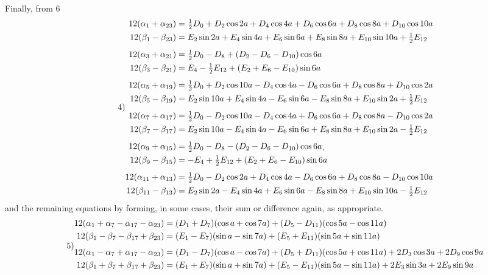 \begin{landscape}
\[\begin{aligned}
\end{aligned}
\]
\clearpage{}
\par\noindent\hspace*{\parindent}Finally, from 6
\[
\tag*{4)}
\begin{aligned}
12(\alpha_1+\alpha_{23})&=\tfrac12 D_0+D_2\cos2a+D_4\cos4a+D_6\cos6a+D_8\cos8a+D_{10}\cos10a\\
12(\beta_1-\beta_{23})&=E_2\sin2a+E_4\sin4a+E_6\sin6a+E_8\sin8a+E_{10}\sin10a+\tfrac12 E_{12}\\[4pt]
12(\alpha_3+\alpha_{21})&=\tfrac12 D_0-D_8+(D_2-D_6-D_{10})\cos6a\\
12(\beta_3-\beta_{21})&=E_4-\tfrac12 E_{12}+(E_2+E_6-E_{10})\sin6a\\[4pt]
12(\alpha_5+\alpha_{19})&=\tfrac12 D_0+D_2\cos10a-D_4\cos4a-D_6\cos6a+D_8\cos8a+D_{10}\cos2a\\
12(\beta_5-\beta_{19})&=E_2\sin10a+E_4\sin4a-E_6\sin6a-E_8\sin8a+E_{10}\sin2a+\tfrac12 E_{12}\\[4pt]
12(\alpha_7+\alpha_{17})&=\tfrac12 D_0-D_2\cos10a-D_4\cos4a+D_6\cos6a+D_8\cos8a-D_{10}\cos2a\\
12(\beta_7-\beta_{17})&=E_2\sin10a-E_4\sin4a-E_6\sin6a+E_8\sin8a+E_{10}\sin2a-\tfrac12 E_{12}\\[4pt]
12(\alpha_9+\alpha_{15})&=\tfrac12 D_0-D_8-(D_2-D_6-D_{10})\cos6a\VthreeTerminalPair\\
12(\beta_9-\beta_{15})&=-E_4+\tfrac12 E_{12}+(E_2+E_6-E_{10})\sin6a\\[4pt]
12(\alpha_{11}+\alpha_{13})&=\tfrac12 D_0-D_2\cos2a+D_4\cos4a-D_6\cos6a+D_8\cos8a-D_{10}\cos10a\\
12(\beta_{11}-\beta_{13})&=E_2\sin2a-E_4\sin4a+E_6\sin6a-E_8\sin8a+E_{10}\sin10a-\tfrac12 E_{12}
\end{aligned}
\]
and the remaining equations by forming, in some cases, their sum or difference again, as appropriate.
\[
\tag*{5)}
\begin{aligned}
12(\alpha_1+\alpha_7-\alpha_{17}-\alpha_{23})&=\VthreeLowDash(D_1+D_7)(\cos a+\cos7a)+(D_5-D_{11})(\cos5a-\cos11a)\\
12(\beta_1-\beta_7-\beta_{17}+\beta_{23})&=(E_1-E_7)(\sin a-\sin7a)+(E_5+E_{11})(\sin5a+\sin11a)\\[4pt]
12(\alpha_1-\alpha_7+\alpha_{17}-\alpha_{23})&=(D_1-D_7)(\cos a-\cos7a)+(D_5+D_{11})(\cos5a+\cos11a)+2D_3\cos3a+2D_9\cos9a\\
12(\beta_1+\beta_7+\beta_{17}+\beta_{23})&=(E_1+E_7)(\sin a+\sin7a)+(E_5-E_{11})(\sin5a-\sin11a)+2E_3\sin3a+2E_9\sin9a\\[4pt]

\end{aligned}\]
\end{landscape}
